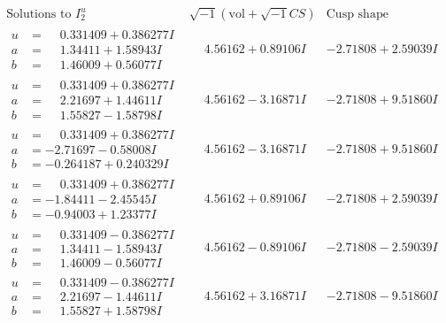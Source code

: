 \documentclass[1p]{elsarticle_modified}
\theoremstyle{definition}
\newcommand{\I}{\sqrt{-1}}
\begin{document}
$$\begin{array}{c|c|c}  
\text{Solutions to }I^u_{2}& \I (\text{vol} + \sqrt{-1}CS) & \text{Cusp shape}\\
 \hline 
\begin{aligned}
u &= \phantom{-}0.331409 + 0.386277 I \\
a &= \phantom{-}1.34411 + 1.58943 I \\
b &= \phantom{-}1.46009 + 0.56077 I\end{aligned}
 & \phantom{-}4.56162 + 0.89106 I & -2.71808 + 2.59039 I \\ \hline\begin{aligned}
u &= \phantom{-}0.331409 + 0.386277 I \\
a &= \phantom{-}2.21697 + 1.44611 I \\
b &= \phantom{-}1.55827 - 1.58798 I\end{aligned}
 & \phantom{-}4.56162 - 3.16871 I & -2.71808 + 9.51860 I \\ \hline\begin{aligned}
u &= \phantom{-}0.331409 + 0.386277 I \\
a &= -2.71697 - 0.58008 I \\
b &= -0.264187 + 0.240329 I\end{aligned}
 & \phantom{-}4.56162 - 3.16871 I & -2.71808 + 9.51860 I \\ \hline\begin{aligned}
u &= \phantom{-}0.331409 + 0.386277 I \\
a &= -1.84411 - 2.45545 I \\
b &= -0.94003 + 1.23377 I\end{aligned}
 & \phantom{-}4.56162 + 0.89106 I & -2.71808 + 2.59039 I \\ \hline\begin{aligned}
u &= \phantom{-}0.331409 - 0.386277 I \\
a &= \phantom{-}1.34411 - 1.58943 I \\
b &= \phantom{-}1.46009 - 0.56077 I\end{aligned}
 & \phantom{-}4.56162 - 0.89106 I & -2.71808 - 2.59039 I \\ \hline\begin{aligned}
u &= \phantom{-}0.331409 - 0.386277 I \\
a &= \phantom{-}2.21697 - 1.44611 I \\
b &= \phantom{-}1.55827 + 1.58798 I\end{aligned}
 & \phantom{-}4.56162 + 3.16871 I & -2.71808 - 9.51860 I \\ \hline\begin{aligned}

\end{aligned}
\end{array}$$
\end{document}

